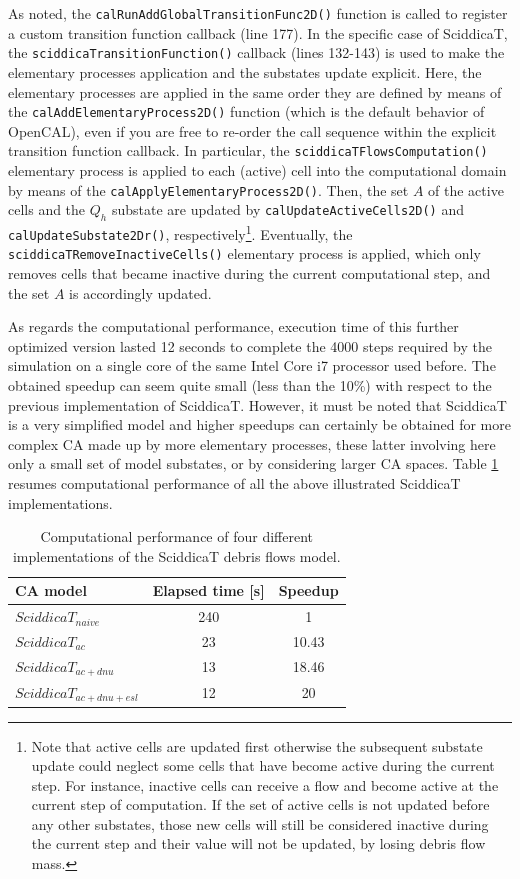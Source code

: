 As noted, the \verb'calRunAddGlobalTransitionFunc2D()' function is
called to register a custom transition function callback (line
177). In the specific case of SciddicaT, the
\verb'sciddicaTransitionFunction()' callback (lines 132-143) is used
to make the elementary processes application and the substates update
explicit. Here, the elementary processes are applied in the same order
they are defined by means of the \verb'calAddElementaryProcess2D()'
function (which is the default behavior of OpenCAL), even if you are
free to re-order the call sequence within the explicit transition
function callback. In particular, the \verb'sciddicaTFlowsComputation()'
elementary process is applied to each (active) cell into the
computational domain by means of the
\verb'calApplyElementaryProcess2D()'. Then, the set $A$ of the active
cells and the $Q_h$ substate are updated by
\verb'calUpdateActiveCells2D()' and \verb'calUpdateSubstate2Dr()',
respectively\footnote{Note that active cells are updated first
  otherwise the subsequent substate update could neglect some cells
  that have become active during the current step. For instance,
  inactive cells can receive a flow and become active at the current
  step of computation. If the set of active cells is not updated
  before any other substates, those new cells will still be considered
  inactive during the current step and their value will not be
  updated, by losing debris flow mass.}. Eventually, the
\verb'sciddicaTRemoveInactiveCells()' elementary process is
applied, which only removes cells that became inactive during the
current computational step, and the set $A$ is accordingly updated.


As regards the computational performance, execution time of this
further optimized version lasted 12 seconds to complete the 4000 steps
required by the simulation on a single core of the same Intel Core i7
processor used before. The obtained speedup can seem quite small (less
than the 10\%) with respect to the previous implementation of
SciddicaT. However, it must be noted that SciddicaT is a very
simplified model and higher speedups can certainly be obtained for
more complex CA made up by more elementary processes, these latter
involving here only a small set of model substates, or by considering
larger CA spaces. Table \ref{tab:speedup} resumes computational
performance of all the above illustrated SciddicaT implementations.

\begin{table}
  \centering
  \begin{tabular}{l|c|c}
    \hline
    CA model & Elapsed time [s] & Speedup \\
    \hline
    $SciddicaT_{naive}$      & 240 & 1\\
    $SciddicaT_{ac}$         & 23  & 10.43\\
    $SciddicaT_{ac+dnu}$     & 13  & 18.46\\
    $SciddicaT_{ac+dnu+esl}$  & 12  & 20\\
    \hline
  \end{tabular}
  \caption{Computational performance of four different
    implementations of the SciddicaT debris flows model.}
  \label{tab:speedup}
\end{table}


